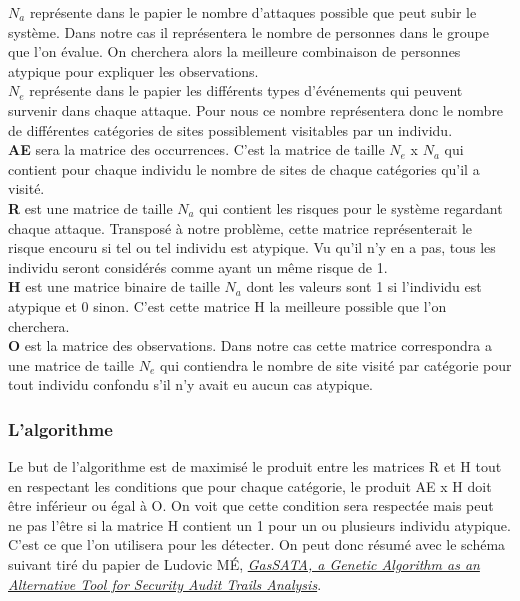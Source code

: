\documentclass[a4paper, 11pt]{article}
\begin{document}
\textbf{$N_a$} représente dans le papier le nombre d'attaques possible que peut subir le système. Dans notre cas il représentera le nombre de personnes dans le groupe que l'on évalue. On cherchera alors la meilleure combinaison de personnes atypique pour expliquer les observations.\\

\textbf{$N_e$} représente dans le papier les différents types d'événements qui peuvent survenir dans chaque attaque. Pour nous ce nombre représentera donc le nombre de différentes catégories de sites possiblement visitables par un individu.\\

\textbf{AE} sera la matrice des occurrences. C'est la matrice de taille $N_e$ x $N_a$ qui contient pour chaque individu le nombre de sites de chaque catégories qu'il a visité.\\

\textbf{R} est une matrice de taille $N_a$ qui contient les risques pour le système regardant chaque attaque. Transposé à notre problème, cette matrice représenterait le risque encouru si tel ou tel individu est atypique. Vu qu'il n'y en a pas, tous les individu seront considérés comme ayant un même risque de 1.\\

\textbf{H} est une matrice binaire de taille $N_a$ dont les valeurs sont 1 si l'individu est atypique et 0 sinon. C'est cette matrice H la meilleure possible que l'on cherchera.\\

\textbf{O} est la matrice des observations. Dans notre cas cette matrice correspondra a une matrice de taille $N_e$ qui contiendra le nombre de site visité par catégorie pour tout individu confondu s'il n'y avait eu aucun cas atypique.


\subsubsection{L'algorithme}

Le but de l'algorithme est de maximisé le produit entre les matrices R et H tout en respectant les conditions que pour chaque catégorie, le produit AE x H doit être inférieur ou égal  à O. On voit que cette condition sera respectée mais peut ne pas l'être si la matrice H contient un 1 pour un ou plusieurs individu atypique. C'est ce que l'on utilisera pour les détecter. On peut donc résumé avec le schéma suivant tiré du papier de Ludovic MÉ, \href{http://www.rennes.supelec.fr/ren/perso/lme/PUBLI/raid98.pdf}{\emph{GasSATA, a Genetic Algorithm as an Alternative Tool for Security Audit Trails Analysis}}.
\end{document}
